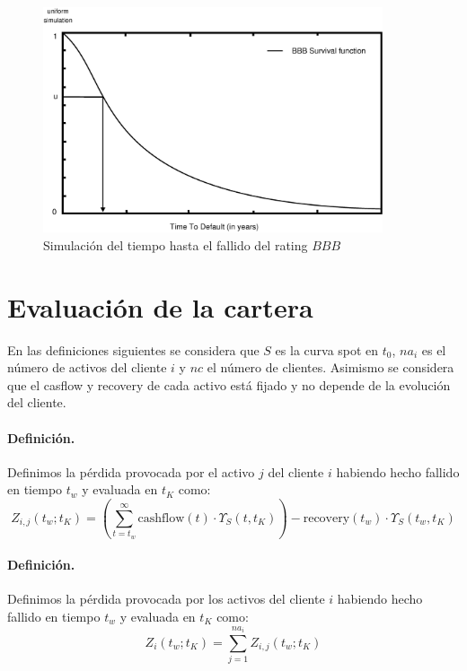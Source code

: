\begin{figure}[!hb]
\begin{center}
\includegraphics[width=10cm,angle=0]{./images/simttd.eps}
\caption{Simulaci\'on del tiempo hasta el fallido del rating $BBB$}
\label{simttd}
\end{center}
\end{figure}


\section{Evaluaci\'on de la cartera}

En las definiciones siguientes se considera que $S$ es la curva spot en $t_0$,
$na_i$ es el n\'umero de activos del cliente $i$ y $nc$ el n\'umero de clientes.
Asimismo se considera que el casflow y recovery de cada activo est\'a fijado y
no depende de la evoluci\'on del cliente.

\paragraph{Definici\'on.} Definimos la p\'erdida provocada por el activo $j$ del 
cliente $i$ habiendo hecho fallido en tiempo $t_w$ y evaluada en $t_K$ como:
\begin{displaymath}
Z_{i,j}(t_w; t_K) =
\left(
\sum_{t=t_w}^{\infty} \textrm{cashflow}(t) \cdot \Upsilon_S(t,t_K)
\right)
- \textrm{recovery}(t_w) \cdot \Upsilon_S(t_w,t_K)
\end{displaymath}

\paragraph{Definici\'on.} Definimos la p\'erdida provocada por los activos del 
cliente $i$ habiendo hecho fallido en tiempo $t_w$ y evaluada en $t_K$ como:
\begin{equation}
Z_i(t_w;t_K) = \sum_{j=1}^{na_i} Z_{i,j}(t_w;t_K)
\end{equation}

